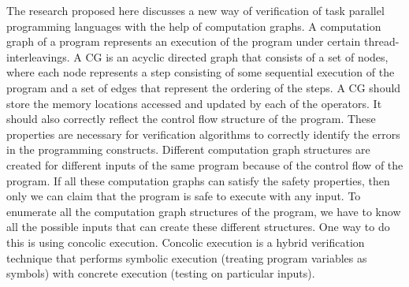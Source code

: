  The research proposed here discusses a new way of verification of task parallel programming languages with the help of computation graphs. A computation graph of a program represents an execution of the program under certain thread-interleavings. A CG is an acyclic directed graph that consists of a set of nodes, where each node represents a step consisting of some sequential execution of the program and a set of edges that represent the ordering of the steps. A CG should store the memory locations accessed and updated by each of the operators. It should also correctly reflect the control flow structure of the program. These properties are necessary for verification algorithms to correctly identify the errors in the programming constructs. Different computation graph structures are created for different inputs of the same program because of the control flow of the program. If all these computation graphs can satisfy the safety properties, then only we can claim that the program is safe to execute with any input. To enumerate all the computation graph structures of the program, we have to know all the possible inputs that can create these different structures. One way to do this is using concolic execution. Concolic execution is a hybrid verification technique that performs symbolic execution (treating program variables as symbols) with concrete execution (testing on particular inputs).